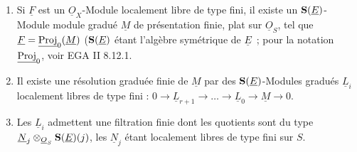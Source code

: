 \begin{enumerate}[label=\alph*)]
\item Si \(\underline{F}\) est un \(\underline{O}_X\)-Module localement libre de type fini, il existe un \(\mathbf{S}(\underline{E})\)-Module module gradué \(\underline{M}\) de présentation finie, plat sur \(\underline{O}_S\), tel que \(\underline{F}=\underline{\operatorname{Proj}}_0(\underline{M})\) (\(\mathbf{S}(\underline{E})\) étant l'algèbre symétrique de \(\underline{E}\)~; pour la notation \(\underline{\operatorname{Proj}}_0\), voir EGA II 8.12.1.

\item Il existe une résolution graduée finie de \(\underline{M}\) par des \(\mathbf{S}(\underline{E})\)-Modules gradués \(\underline{L}_i\) localement libres de type fini : \(0\longrightarrow \underline{L}_{r+1}\longrightarrow\ldots\longrightarrow \underline{L}_0\longrightarrow \underline{M}\longrightarrow 0\).

\item Les \(\underline{L}_i\) admettent une filtration finie dont les quotients sont du type \(\underline{N}_j\otimes_{\underline{O}_S}\mathbf{S}(\underline{E})(j)\), les \(\underline{N}_j\) étant localement libres de type fini sur \(S\).
\end{enumerate}

